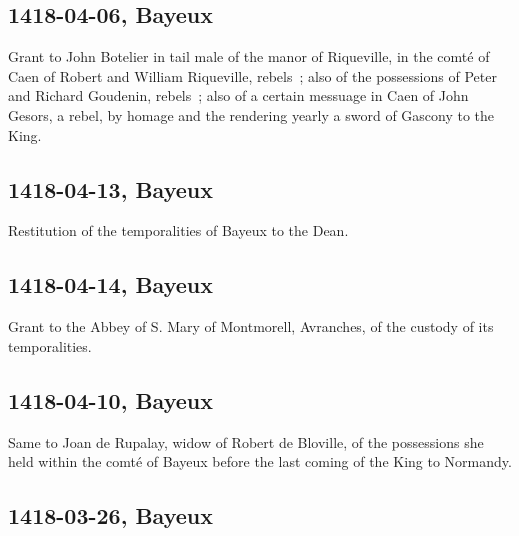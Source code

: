 \documentclass[a4paper,12pt,twoside]{book}
\begin{document}
                
                \subsection{1418-04-06, Bayeux}
                
                
                     Grant to John Botelier in tail male of the manor of Riqueville, in the comté of Caen of Robert and William Riqueville, rebels ; also of the possessions of Peter and Richard Goudenin, rebels ; also of a certain messuage in Caen of John Gesors, a rebel, by homage and the rendering yearly a sword of Gascony to the King.
                  
                
                \subsection{1418-04-13, Bayeux}
                
                
                     Restitution of the temporalities of Bayeux to the Dean.
                  
                
                \subsection{1418-04-14, Bayeux}
                
                
                     Grant to the Abbey of S. Mary of Montmorell, Avranches, of the custody of its temporalities.
                  
                
                \subsection{1418-04-10, Bayeux}
                
                
                     Same to Joan de Rupalay, widow of Robert de Bloville, of the possessions she held within the comté of Bayeux before the last coming of the King to Normandy.
                  
                
                \subsection{1418-03-26, Bayeux}
                
\end{document}
